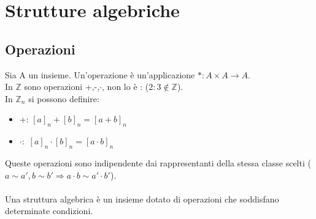 \documentclass{article}
\begin{document}
\section{Strutture algebriche}
\subsection{Operazioni}
Sia A un insieme. Un'operazione è un'applicazione $*:A\times A\rightarrow A$.\\
In $\mathds{Z}$ sono operazioni +,-,$\cdot$, non lo è : ($2:3\notin\mathds{Z}$).\\
In $\mathds{Z}_n$ si possono definire:\begin{itemize}
    \item +: $[a]_n+[b]_n=[a+b]_n$
    \item $\cdot:$ $[a]_n\cdot[b]_n=[a\cdot b]_n$
\end{itemize}
Queste operazioni sono indipendente dai rappresentanti della stessa classe scelti ($a\sim a', b\sim b'\Rightarrow a\cdot b\sim a'\cdot b'$).\\\\
Una struttura algebrica è un insieme dotato di operazioni che soddisfano determinate condizioni.
\end{document}
